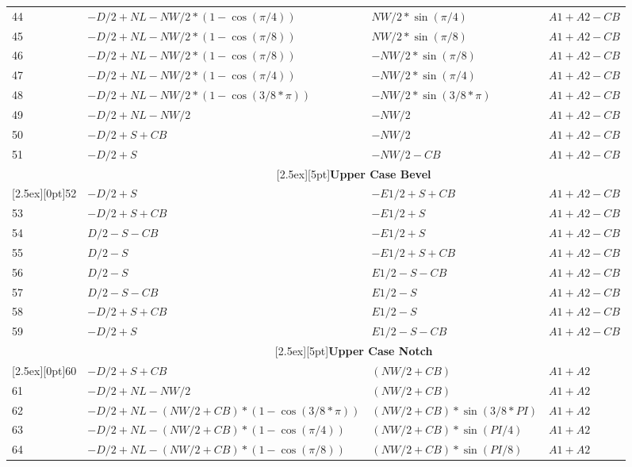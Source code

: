 \documentclass[a4paper]{article}
\begin{document}
\begin{longtable}{|l|l|l|l|}
44 & $-D/2+NL-NW/2*(1-\cos(\pi/4))$   & $NW/2*\sin(\pi/4)$    & $A1+A2-CB$\\
45 & $-D/2+NL-NW/2*(1-\cos(\pi/8))$   & $NW/2*\sin(\pi/8)$    & $A1+A2-CB$\\
46 & $-D/2+NL-NW/2*(1-\cos(\pi/8))$   & $-NW/2*\sin(\pi/8)$   & $A1+A2-CB$\\
47 & $-D/2+NL-NW/2*(1-\cos(\pi/4))$   & $-NW/2*\sin(\pi/4)$   & $A1+A2-CB$\\
48 & $-D/2+NL-NW/2*(1-\cos(3/8*\pi))$ & $-NW/2*\sin(3/8*\pi)$ & $A1+A2-CB$\\
49 & $-D/2+NL-NW/2$                   & $-NW/2$               & $A1+A2-CB$\\
50 & $-D/2 + S + CB$                  & $-NW/2$               & $A1+A2-CB$\\
51 & $-D/2 + S$                       & $-NW/2 - CB$          & $A1+A2-CB$\\
\hline
&\multicolumn{3}{|c|}{\raisebox{0pt}[2.5ex][5pt]{\textbf{Upper Case Bevel}}}\\\cline{2-4}
\raisebox{0pt}[2.5ex][0pt]{52}
   & $-D/2+S$    & $-E1/2+S+CB$ & $A1+A2-CB$\\
53 & $-D/2+S+CB$ & $-E1/2+S$    & $A1+A2-CB$\\
54 & $D/2-S-CB$  & $-E1/2+S$    & $A1+A2-CB$\\
55 & $D/2-S$     & $-E1/2+S+CB$ & $A1+A2-CB$\\
56 & $D/2-S$     & $E1/2-S-CB$  & $A1+A2-CB$\\
57 & $D/2-S-CB$  & $E1/2-S$     & $A1+A2-CB$\\
58 & $-D/2+S+CB$ & $E1/2-S$     & $A1+A2-CB$\\
59 & $-D/2+S$    & $E1/2-S-CB$  & $A1+A2-CB$\\
\hline
&\multicolumn{3}{|c|}{\raisebox{0pt}[2.5ex][5pt]{\textbf{Upper Case Notch}}}\\\cline{2-4}
\raisebox{0pt}[2.5ex][0pt]{60}
   & $-D/2 + S + CB$                             & $(NW/2 + CB)$               & $A1+A2$\\
61 & $-D/2 + NL - NW/2$                          & $(NW/2 + CB)$               & $A1+A2$\\
62 & $-D/2 + NL - (NW/2 + CB)*(1-\cos(3/8*\pi))$ & $(NW/2 + CB)*\sin(3/8*PI)$  & $A1+A2$\\
63 & $-D/2 + NL - (NW/2 + CB)*(1-\cos(\pi/4))$   & $(NW/2 + CB)*\sin(PI/4)$    & $A1+A2$\\
64 & $-D/2 + NL - (NW/2 + CB)*(1-\cos(\pi/8))$   & $(NW/2 + CB)*\sin(PI/8)$    & $A1+A2$\\

\end{longtable}
\end{document}

